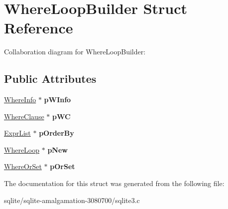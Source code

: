 \hypertarget{struct_where_loop_builder}{\section{Where\+Loop\+Builder Struct Reference}
\label{struct_where_loop_builder}
}


Collaboration diagram for Where\+Loop\+Builder\+:
\subsection*{Public Attributes}
\begin{DoxyCompactItemize}
\item 
\hypertarget{struct_where_loop_builder_a45e1ed33ef11ee2c08af6edcda9e5654}{\hyperlink{struct_where_info}{Where\+Info} $\ast$ {\bfseries p\+W\+Info}}\label{struct_where_loop_builder_a45e1ed33ef11ee2c08af6edcda9e5654}

\item 
\hypertarget{struct_where_loop_builder_aff76c3f8b34e4588c587708d59fb6bc9}{\hyperlink{struct_where_clause}{Where\+Clause} $\ast$ {\bfseries p\+W\+C}}\label{struct_where_loop_builder_aff76c3f8b34e4588c587708d59fb6bc9}

\item 
\hypertarget{struct_where_loop_builder_a16de740f297add3d4b36905c21554a86}{\hyperlink{struct_expr_list}{Expr\+List} $\ast$ {\bfseries p\+Order\+By}}\label{struct_where_loop_builder_a16de740f297add3d4b36905c21554a86}

\item 
\hypertarget{struct_where_loop_builder_ae3ab5ddb99b1d4697f573e9b25442f65}{\hyperlink{struct_where_loop}{Where\+Loop} $\ast$ {\bfseries p\+New}}\label{struct_where_loop_builder_ae3ab5ddb99b1d4697f573e9b25442f65}

\item 
\hypertarget{struct_where_loop_builder_adf94dbe3918353f2d9ebfc0bf69d9685}{\hyperlink{struct_where_or_set}{Where\+Or\+Set} $\ast$ {\bfseries p\+Or\+Set}}\label{struct_where_loop_builder_adf94dbe3918353f2d9ebfc0bf69d9685}

\end{DoxyCompactItemize}


The documentation for this struct was generated from the following file\+:\begin{DoxyCompactItemize}
\item 
sqlite/sqlite-\/amalgamation-\/3080700/sqlite3.\+c\end{DoxyCompactItemize}
